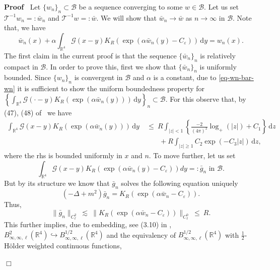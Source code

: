 \documentclass{article}
\newcommand{\backassign}{=:}
\newcommand{\mathd}{\mathrm{d}}
\newenvironment{proof}{\noindent\textbf{Proof\ }}{\hspace*{\fill}$\Box$\medskip}
\begin{document}
\begin{proof}
  Let $\{ w_n \}_n \subset \mathcal{B}$ be a sequence converging to some $w
  \in \mathcal{B}$. Let us set $\mathcal{T}^{- 1} w_n \backassign \bar{w}_n$
  and $\mathcal{T}^{- 1} w \backassign \bar{w} .$ We will show that $\bar{w}_n
  \rightarrow \bar{w} $ as $n \rightarrow \infty$ in $\mathcal{B}.$ Note that,
  we have
  \begin{equation}
      \bar{w}_n (x) + \alpha \int_{\mathbb{R}^4} \mathcal{G} (x - y) K_R (\exp(\alpha \bar{w}_n (y) - C_{\varepsilon})) \, \mathd y = w_n (x) .\label{eq-wn-bar-wn}
  \end{equation}
  The first claim in the current proof is that the sequence $\{ \bar{w}_n
  \}_n$ is relatively compact in $\mathcal{B}$. In order to prove this, first
  we show that $\{ \bar{w}_n \}_n$ is uniformly bounded. Since $\{ w_n \}_n$
  is convergent in $\mathcal{B}$ and $\alpha$ is a constant, due to
  \eqref{eq-wn-bar-wn} it is sufficient to show the uniform boundedness
  property for $\left\{ \int_{\mathbb{R}^4} \mathcal{G} (\cdot - y) K_R (\exp
  (\alpha \bar{w}_n (y))) \, \mathd y \right\}_n \subset \mathcal{B}.$ For this
  observe that, by  (47), (48)  of~{\cite{AVG2021}} we have
  \begin{align}
    \int_{\mathbb{R}^4} \mathcal{G} (x - y) K_R (\exp (\alpha \bar{w}_n
       (y))) \, \mathd y & ~\leq ~R {\int_{| z | < 1}}  \left\{ \frac{-
       2}{(4 \pi)^2} \log_+ (| z |) + C_1 \right\} \,  \mathd z\\
       &   \qquad + R \int_{| z | \geqslant 1} C_2 \exp (- C_3 | z |) \, \mathd z,   
  \end{align}
  where the rhs is bounded uniformly in $x$ and $n$. To move further, let us
  set 
  $$ \int_{\mathbb{R}^4} \mathcal{G} (x - y) K_R (\exp (\alpha \bar{w}_n (y) - C_{\varepsilon})) d y \backassign \bar{g}_n   \textrm{ in }   \mathcal{B}. $$ But by its
  structure we know that $\bar{g}_n$ solves the following equation uniquely
  \[ 
       (- \Delta + m^2) \bar{g}_n = K_R (\exp (\alpha \bar{w}_n -
       C_{\varepsilon})) .
      \]
  Thus, 
  \[ 
       \| \bar{g}_n \|_{C_{\ell}^2} ~\lesssim~ \| K_R
       (\exp (\alpha \bar{w}_n - C_{\varepsilon})) \|_{C_{\ell}^0
       } ~\leq~ R .
     \]
  This further implies, due to embedding, see (3.10) in
  {\cite{mourratGlobalWellposednessDynamic2017}}, $B^2_{\infty, \infty, \ell}
  (\mathbb{R}^4) \hookrightarrow B^{1 / 2}_{\infty, \infty, \ell}
  (\mathbb{R}^4)$ and the equivalency of $B^{1 / 2}_{\infty, \infty, \ell}
  (\mathbb{R}^4)$ with $\frac{1}{2}$-H{\"o}lder weighted continuous functions,

\end{proof}
\end{document}
